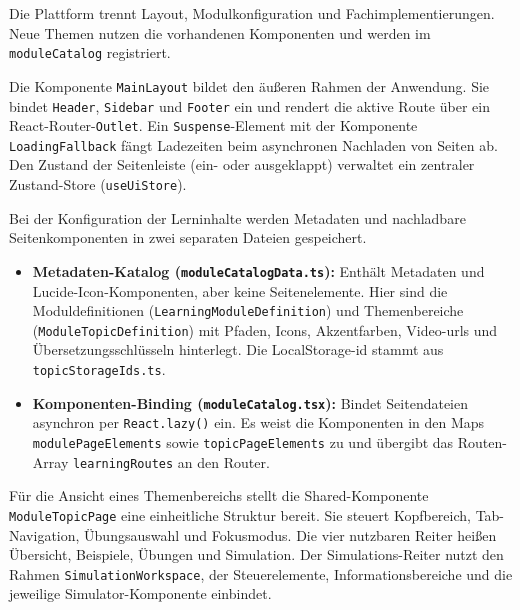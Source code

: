 
Die Plattform trennt Layout, Modulkonfiguration und Fachimplementierungen. Neue Themen nutzen die vorhandenen Komponenten und werden im \verb|moduleCatalog| registriert.

Die Komponente \verb|MainLayout| bildet den äußeren Rahmen der Anwendung. Sie bindet \verb|Header|, \verb|Sidebar| und \verb|Footer| ein und rendert die aktive Route über ein React-Router-\verb|Outlet|. Ein \verb|Suspense|-Element mit der Komponente \verb|LoadingFallback| fängt Ladezeiten beim asynchronen Nachladen von Seiten ab. Den Zustand der Seitenleiste (ein- oder ausgeklappt) verwaltet ein zentraler Zustand-Store (\verb|useUiStore|).

Bei der Konfiguration der Lerninhalte werden Metadaten und nachladbare Seitenkomponenten in zwei separaten Dateien gespeichert.
\begin{itemize}
  \item \textbf{Metadaten-Katalog (\texttt{moduleCatalogData.ts}):} Enthält Metadaten und Lucide-Icon-Komponenten, aber keine Seitenelemente. Hier sind die Moduldefinitionen (\texttt{Learning\-Module\-Definition}) und Themenbereiche (\texttt{Module\-Topic\-Definition}) mit Pfaden, Icons, Akzentfarben, Video-\glspl{url} und Übersetzungsschlüsseln hinterlegt. Die LocalStorage-\gls{id} stammt aus \texttt{topic\-Storage\-Ids.ts}.
  \item \textbf{Komponenten-Binding (\texttt{moduleCatalog.tsx}):} Bindet Seitendateien asynchron per \texttt{React.lazy()} ein. Es weist die Komponenten in den Maps \texttt{modulePage\-Elements} sowie \texttt{topicPage\-Elements} zu und übergibt das Routen-Array \texttt{learningRoutes} an den Router.
\end{itemize}

Für die Ansicht eines Themenbereichs stellt die Shared-Komponente \verb|ModuleTopicPage| eine einheitliche Struktur bereit. Sie steuert Kopfbereich, Tab-Navigation, Übungsauswahl und Fokusmodus. Die vier nutzbaren Reiter heißen Übersicht, Beispiele, Übungen und Simulation. Der Simulations-Reiter nutzt den Rahmen \verb|SimulationWorkspace|, der Steuerelemente, Informationsbereiche und die jeweilige Simulator-Komponente einbindet.

